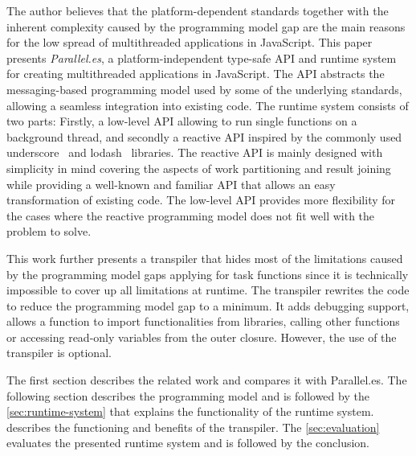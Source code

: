 The author believes that the platform-dependent standards together with the inherent complexity caused by the programming model gap are the main reasons for the low spread of multithreaded applications in JavaScript. This paper presents \textit{Parallel.es}, a platform-independent type-safe API and runtime system for creating multithreaded applications in JavaScript. The API abstracts the messaging-based programming model used by some of the underlying standards, allowing a seamless integration into existing code. The runtime system consists of two parts: Firstly, a low-level API allowing to run single functions on a background thread, and secondly a reactive API inspired by the commonly used underscore~\cite{underscorejs} and lodash~\cite{lodash} libraries. The reactive API is mainly designed with simplicity in mind covering the aspects of work partitioning and result joining while providing a well-known and familiar API that allows an easy transformation of existing code. The low-level API provides more flexibility for the cases where the reactive programming model does not fit well with the problem to solve.

This work further presents a transpiler that hides most of the limitations caused by the programming model gaps applying for task functions since it is technically impossible to cover up all limitations at runtime. The transpiler rewrites the code to reduce the programming model gap to a minimum. It adds debugging support, allows a function to import functionalities from libraries, calling other functions or accessing read-only variables from the outer closure. However, the use of the transpiler is optional. 


The first section describes the related work and compares it with Parallel.es. The following section describes the programming model and is followed by the \cref{sec:runtime-system} that explains the functionality of the runtime system.  describes the functioning and benefits of the transpiler. The \cref{sec:evaluation} evaluates the presented runtime system and is followed by the conclusion. 
